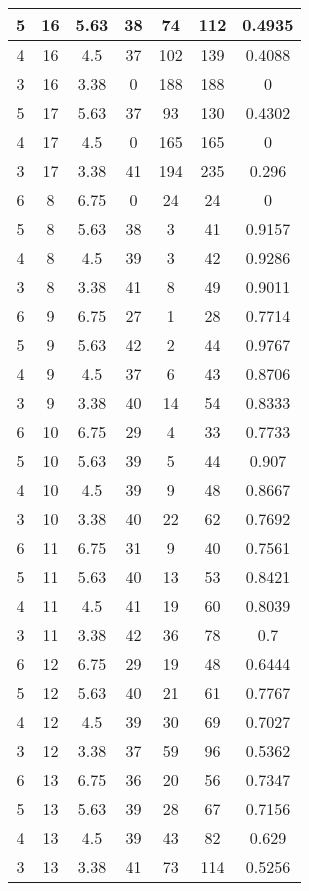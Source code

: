 \documentclass[letterpaper, 12pt]{article}
\begin{document}
\begin{longtable}{|c|c|c|c|c|c|c|}
\hline
5 & 16 & 5.63 & 38 & 74 & 112 & 0.4935 \\
\hline
4 & 16 & 4.5 & 37 & 102 & 139 & 0.4088 \\
\hline
3 & 16 & 3.38 & 0 & 188 & 188 & 0 \\
\hline
5 & 17 & 5.63 & 37 & 93 & 130 & 0.4302 \\
\hline
4 & 17 & 4.5 & 0 & 165 & 165 & 0 \\
\hline
3 & 17 & 3.38 & 41 & 194 & 235 & 0.296 \\
\hline
6 & 8 & 6.75 & 0 & 24 & 24 & 0 \\
\hline
5 & 8 & 5.63 & 38 & 3 & 41 & 0.9157 \\
\hline
4 & 8 & 4.5 & 39 & 3 & 42 & 0.9286 \\
\hline
3 & 8 & 3.38 & 41 & 8 & 49 & 0.9011 \\
\hline
6 & 9 & 6.75 & 27 & 1 & 28 & 0.7714 \\
\hline
5 & 9 & 5.63 & 42 & 2 & 44 & 0.9767 \\
\hline
4 & 9 & 4.5 & 37 & 6 & 43 & 0.8706 \\
\hline
3 & 9 & 3.38 & 40 & 14 & 54 & 0.8333 \\
\hline
6 & 10 & 6.75 & 29 & 4 & 33 & 0.7733 \\
\hline
5 & 10 & 5.63 & 39 & 5 & 44 & 0.907 \\
\hline
4 & 10 & 4.5 & 39 & 9 & 48 & 0.8667 \\
\hline
3 & 10 & 3.38 & 40 & 22 & 62 & 0.7692 \\
\hline
6 & 11 & 6.75 & 31 & 9 & 40 & 0.7561 \\
\hline
5 & 11 & 5.63 & 40 & 13 & 53 & 0.8421 \\
\hline
4 & 11 & 4.5 & 41 & 19 & 60 & 0.8039 \\
\hline
3 & 11 & 3.38 & 42 & 36 & 78 & 0.7 \\
\hline
6 & 12 & 6.75 & 29 & 19 & 48 & 0.6444 \\
\hline
5 & 12 & 5.63 & 40 & 21 & 61 & 0.7767 \\
\hline
4 & 12 & 4.5 & 39 & 30 & 69 & 0.7027 \\
\hline
3 & 12 & 3.38 & 37 & 59 & 96 & 0.5362 \\
\hline
6 & 13 & 6.75 & 36 & 20 & 56 & 0.7347 \\
\hline
5 & 13 & 5.63 & 39 & 28 & 67 & 0.7156 \\
\hline
4 & 13 & 4.5 & 39 & 43 & 82 & 0.629 \\
\hline
3 & 13 & 3.38 & 41 & 73 & 114 & 0.5256 \\

\end{longtable}
\end{document}

